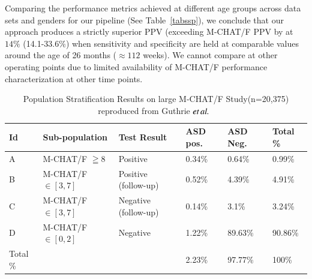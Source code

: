 \documentclass[onecolumn, compsoc,11pt]{IEEEtran}
\renewcommand{\captionN}[1]{\caption{\color{CadetBlue4!80!black} \sffamily \fontsize{9}{10}\selectfont #1  }}
\begin{document}
Comparing the performance metrics achieved at different age groups across data sets and genders for our pipeline (See Table~\ref{tabssp}), we conclude that our approach produces a strictly superior PPV (exceeding M-CHAT/F PPV by at  $14\%$ (14.1-33.6\%) when sensitivity and specificity are held at comparable values around the age of 26 months ($\approx 112$ weeks). We cannot compare at other operating points due to limited availability of M-CHAT/F performance characterization at other time points.
\begin{table}[t]
  \centering

  \captionN{Population Stratification Results on large M-CHAT/F Study(n=20,375)  reproduced from Guthrie $\textit{et} \mspace{3mu} \textit{al.}$~\cite{pmid31562252} }\label{tabCHOP}
\footnotesize
  \begin{tabular}{C{.65in} | L{1.5in}|L{1.5in}|L{1in}|L{1in}||L{.55in}}\hline
 \bf \sffamily   Id &  \bf \sffamily Sub-population & \bf \sffamily Test Result & \bf \sffamily ASD pos. & \bf \sffamily ASD Neg. & \bf \sffamily Total \% \\\hline
   A &  M-CHAT/F $\geqq 8$ & Positive & 0.34\% & 0.64\% & 0.99\% \\\hline
  B &   M-CHAT/F $\in [3,7]$ & Positive (follow-up)& 0.52\% & 4.39\% & 4.91\% \\\hline
 C &    M-CHAT/F $\in [3,7]$ & Negative (follow-up)& 0.14\% & 3.1\% & 3.24\% \\\hline
  D &   M-CHAT/F $\in [0,2] $ & Negative & 1.22\% & 89.63\% & 90.86\% \\\hline\hline
    Total \%& &   &2.23\% & 97.77\% & 100\% \\\hline
    \end{tabular}
\end{table}
\end{document}
